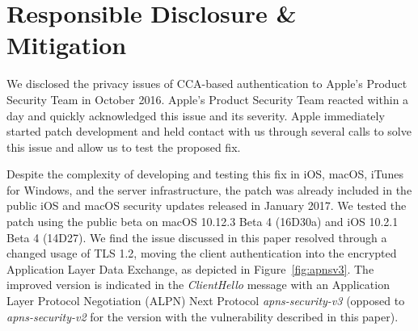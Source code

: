 \section{Responsible Disclosure \& Mitigation}%
\label{sec:disclosure}
We disclosed the privacy issues of CCA-based {\apns} authentication to Apple's Product Security Team in October 2016.
Apple's Product Security Team reacted within a day and quickly acknowledged this issue and its severity.
Apple immediately started patch development and held contact with us through several calls to solve this issue and allow us to test the proposed fix.

Despite the complexity of developing and testing this fix in iOS, macOS, iTunes for Windows, and the {\apns} server infrastructure, the patch was already included in the public iOS and macOS security updates released in January 2017.
We tested the patch using the public beta on macOS 10.12.3 Beta 4 (16D30a) and iOS 10.2.1 Beta 4 (14D27).
We find the issue discussed in this paper resolved through a changed usage of TLS 1.2, moving the client authentication into the encrypted Application Layer Data Exchange, as depicted in Figure~\ref{fig:apnsv3}.
The improved version is indicated in the \emph{ClientHello} message with an Application Layer Protocol Negotiation (ALPN) Next Protocol \emph{apns-security-v3} (opposed to \emph{apns-security-v2} for the version with the vulnerability described in this paper).

